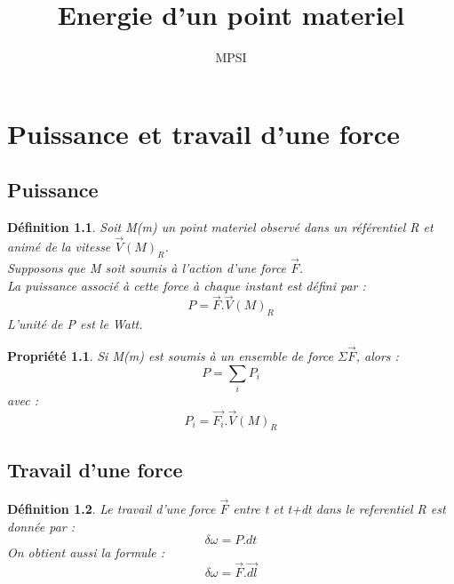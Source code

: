 \documentclass[a4paper,12pt,oneside]{report}
\title{Energie d'un point materiel}
\author{MPSI}
\newtheorem{de}{Définition}
\newtheorem{prop}{Propriété}
\begin{document}
\maketitle
\tableofcontents
\chapter{Puissance et travail d'une force}
\section{Puissance}
\begin{de}
Soit M(m) un point materiel observé dans un référentiel R et animé de la vitesse $\overrightarrow{V}(M)_R$.\\
Supposons que M soit soumis à l'action d'une force $\overrightarrow{F}$.\\
La puissance associé à cette force à chaque instant est défini par :
$$P = \overrightarrow{F}.\overrightarrow{V}(M)_R$$
L'unité de P est le Watt.
\end{de}
\begin{prop}
Si M(m) est soumis à un ensemble de force $\Sigma \overrightarrow{F}$, alors :
$$P = \sum_i P_i$$
avec :
$$P_i = \overrightarrow{F_i}.\overrightarrow{V}(M)_R$$
\end{prop}
\section{Travail d'une force}
\begin{de}
Le travail d'une force $\overrightarrow{F}$ entre t et t+dt dans le referentiel R est donnée par :
$$\delta\omega = P.dt$$
On obtient aussi la formule :
$$\delta\omega = \overrightarrow{F}.\overrightarrow{dl}$$
\end{de}
\end{document}
